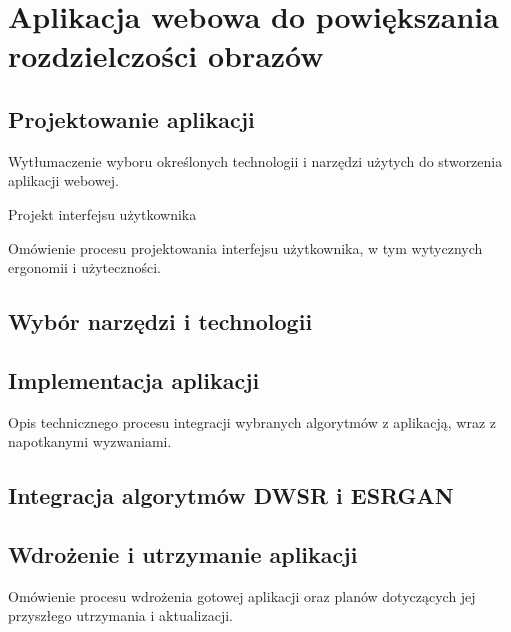 \chapter{Aplikacja webowa do powiększania rozdzielczości obrazów}


\section{Projektowanie aplikacji}






Wytłumaczenie wyboru określonych technologii i narzędzi użytych do stworzenia aplikacji webowej.


Projekt interfejsu użytkownika



Omówienie procesu projektowania interfejsu użytkownika, w tym wytycznych ergonomii i użyteczności.

\section{Wybór narzędzi i technologii}



\section{Implementacja aplikacji}



Opis technicznego procesu integracji wybranych algorytmów z aplikacją, wraz z napotkanymi wyzwaniami.

\section{Integracja algorytmów DWSR i ESRGAN}


\section{Wdrożenie i utrzymanie aplikacji}

Omówienie procesu wdrożenia gotowej aplikacji oraz planów dotyczących jej przyszłego utrzymania i aktualizacji.
